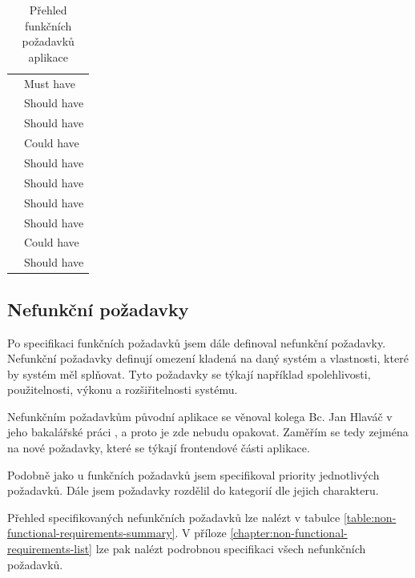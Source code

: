 \begin{table}[!ht]
\begin{tabular}{@{} l l @{}}
        \nameref{sec:fp-subscription-system} & Must have \\
        \nameref{sec:fp-free-trial} & Should have \\
        \nameref{sec:fp-avatar-customization} & Should have \\
        \nameref{sec:fp-shop-unlock-items} & Could have \\
        \nameref{sec:fp-user-profile} & Should have \\
        \nameref{sec:fp-streak-freeze} & Should have \\
        \nameref{sec:fp-extended-notifications} & Should have \\
        \nameref{sec:fp-treasure-chest} & Should have \\
        \nameref{sec:fp-leaderboard} & Could have \\
        \nameref{sec:fp-progress-sharing} & Should have \\
        
        \bottomrule
    \end{tabular}
    \captionsetup{justification=centering}
    \caption{Přehled funkčních požadavků aplikace}
    \label{table:requirements-summary}
\end{table}

\subsection{Nefunkční požadavky}

Po specifikaci funkčních požadavků jsem dále definoval nefunkční požadavky. Nefunkční požadavky definují omezení kladená na daný systém a vlastnosti, které by systém měl splňovat. Tyto požadavky se týkají například spolehlivosti, použitelnosti, výkonu a rozšiřitelnosti systému. \cite[4-5]{UseCases}

Nefunkčním požadavkům původní aplikace se věnoval kolega Bc. Jan Hlaváč v jeho bakalářské práci \cite{Hlavac2024BachelorThesis}, a proto je zde nebudu opakovat. Zaměřím se tedy zejména na nové požadavky, které se týkají frontendové části aplikace.

Podobně jako u funkčních požadavků jsem specifikoval priority jednotlivých požadavků. Dále jsem požadavky rozdělil do kategorií dle jejich charakteru.

Přehled specifikovaných nefunkčních požadavků lze nalézt v tabulce \ref{table:non-functional-requirements-summary}. V příloze \ref{chapter:non-functional-requirements-list} lze pak nalézt podrobnou specifikaci všech nefunkčních požadavků.

